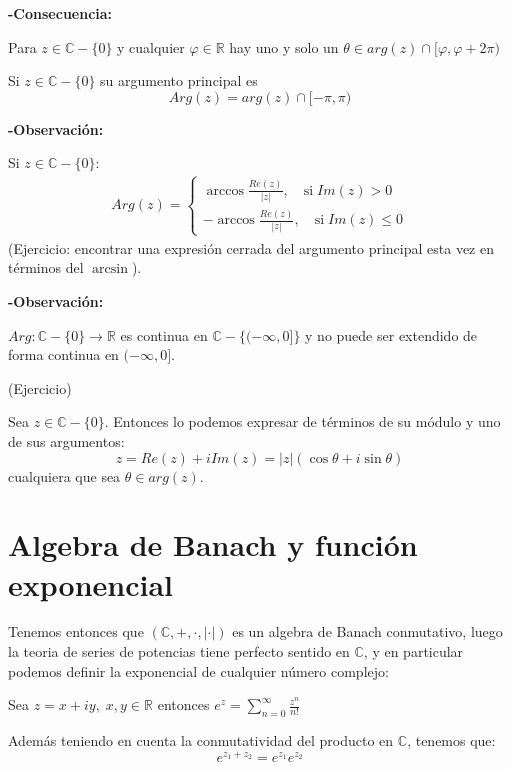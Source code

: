\textbf{-Consecuencia:}

Para \(z\in \mathbb{C}-\{0\}\) y cualquier \(\varphi \in \mathbb{R}\) hay uno y solo un \( \theta \in arg(z) \cap [\varphi, \varphi+2\pi)\)

\begin{definicion}
  Si \(z \in \mathbb{C}-\{0\}\) su argumento principal es
  \[Arg(z) = arg(z) \cap [-\pi, \pi)\]
\end{definicion}

\textbf{-Observación:}

Si \(z \in \mathbb{C}-\{0\}\):
\begin{eqnarray*}
  Arg(z) = \begin{cases}
    \arccos \frac{Re(z)}{|z|} , \quad \text{si} \; Im(z) > 0 \\
    -\arccos \frac{Re(z)}{|z|} , \quad \text{si} \; Im(z) \leq 0
  \end{cases}
\end{eqnarray*}
(Ejercicio: encontrar una expresión cerrada del argumento principal esta vez en términos del \(\arcsin\)).

\textbf{-Observación:}

\(Arg: \mathbb{C}-\{0\} \rightarrow \mathbb{R}\) es continua en \(\mathbb{C}-\{ (-\infty, 0] \}\) y no puede ser extendido de forma continua en \((-\infty, 0]\).

(Ejercicio)

\begin{definicion}
  Sea \(z \in \mathbb{C}-\{0\}\). Entonces lo podemos expresar de términos de su módulo y uno de sus argumentos:
  \[ z = Re(z) + i Im(z) = |z| (\cos \theta + i \sin \theta)\]
 cualquiera que sea \(\theta \in arg(z)\).
\end{definicion}

\section{Algebra de Banach y función exponencial}
Tenemos entonces que \((\mathbb{C},+,\cdot, |\cdot|)\) es un algebra de Banach conmutativo, luego la teoria de series de potencias tiene perfecto sentido en \(\mathbb{C}\), y en particular podemos definir la exponencial de cualquier número complejo:

Sea \(z=x+iy, \; x,y\in \mathbb{R}\) entonces \(e^z=\sum\limits_{n=0}^{\infty}\frac{z^n}{n!}\)

Además teniendo en cuenta la conmutatividad del producto en \(\mathbb{C}\), tenemos que:
\[e^{z_1+z_2}=e^{z_1}e^{z_2}\]

